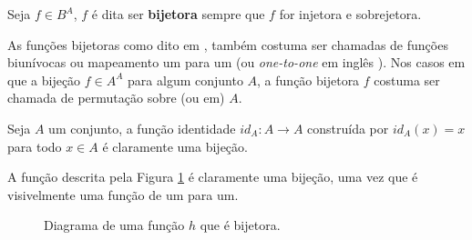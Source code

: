 \begin{definicao}\label{def:FuncaoBijetora}
	Seja $f \in B^A$, $f$ é dita ser \textbf{bijetora} sempre que $f$ for injetora e sobrejetora.
\end{definicao}

As funções bijetoras como dito em \cite{lipschutz1971-Topo}, também costuma ser chamadas de funções biunívocas ou mapeamento um para um (ou \textit{one-to-one} em inglês \cite{carmo2013}). Nos casos em que a bijeção $f \in A^A$ para algum conjunto $A$, a função bijetora $f$ costuma ser chamada de permutação \cite{carmo2013} sobre (ou em) $A$. 

\begin{exemplo}\label{exe:FuncaoIdentidade}
  Seja $A$ um conjunto, a função identidade $id_A : A \rightarrow A$ construída por $id_A(x) = x$ para todo $x \in A$ é claramente uma bijeção.
\end{exemplo}

\begin{exemplo}
  A função descrita pela Figura \ref{fig:FuncaoBijetora1} é claramente uma bijeção, uma vez que é visivelmente uma função de um para um.
\end{exemplo}

\begin{figure}[H]
	\centering
	\caption{Diagrama de uma função $h$ que é bijetora.}
	\label{fig:FuncaoBijetora1}	
\end{figure}

